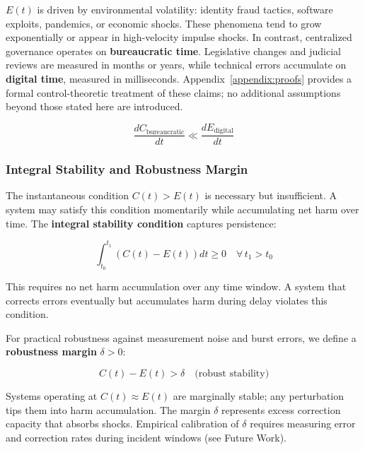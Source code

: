 $E(t)$ is driven by environmental volatility: identity fraud tactics, software exploits, pandemics, or economic shocks. These phenomena tend to grow exponentially or appear in high-velocity impulse shocks. In contrast, centralized governance operates on \textbf{bureaucratic time}. Legislative changes and judicial reviews are measured in months or years, while technical errors accumulate on \textbf{digital time}, measured in milliseconds. Appendix~\ref{appendix:proofs} provides a formal control-theoretic treatment of these claims; no additional assumptions beyond those stated here are introduced.

\begin{equation}
\frac{dC_{\text{bureaucratic}}}{dt} \ll \frac{dE_{\text{digital}}}{dt}
\end{equation}

\subsubsection{Integral Stability and Robustness Margin}

The instantaneous condition $C(t) > E(t)$ is necessary but insufficient. A system may satisfy this condition momentarily while accumulating net harm over time. The \textbf{integral stability condition} captures persistence:

\begin{equation}
\int_{t_0}^{t_1} \left( C(t) - E(t) \right) dt \geq 0 \quad \forall \, t_1 > t_0
\label{eq:integral-stability}
\end{equation}

This requires no net harm accumulation over any time window. A system that corrects errors eventually but accumulates harm during delay violates this condition.

For practical robustness against measurement noise and burst errors, we define a \textbf{robustness margin} $\delta > 0$:

\begin{equation}
C(t) - E(t) > \delta \quad \text{(robust stability)}
\label{eq:robustness-margin}
\end{equation}

Systems operating at $C(t) \approx E(t)$ are marginally stable; any perturbation tips them into harm accumulation. The margin $\delta$ represents excess correction capacity that absorbs shocks. Empirical calibration of $\delta$ requires measuring error and correction rates during incident windows (see Future Work).

